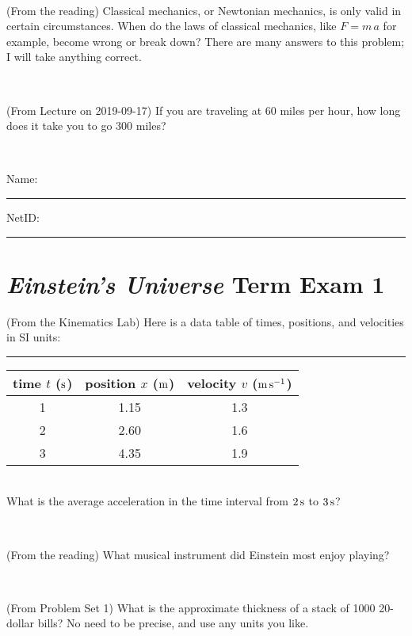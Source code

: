 \documentclass[12pt, letterpaper]{article}
\begin{document}
\vfill ~

\begin{problem} (From the reading)
Classical mechanics, or Newtonian mechanics, is only valid in certain
circumstances. When do the laws of classical mechanics, like $F =
m\,a$ for example, become wrong or break down? There are many answers
to this problem; I will take anything correct.
\end{problem}


\vfill ~

\begin{problem} (From Lecture on 2019-09-17)
If you are traveling at 60 miles per hour, how long does
it take you to go 300 miles?
\end{problem}


\vfill ~


\cleardoublepage



\noindent
Name: \rule[-1ex]{0.60\textwidth}{0.1pt}
NetID: \rule[-1ex]{0.20\textwidth}{0.1pt}

\section*{\textsl{Einstein's Universe} Term Exam 1}
\setcounter{problem}{1}


\begin{problem} (From the Kinematics Lab)
Here is a data table of times, positions, and velocities in SI units:\\
\rule{1.0in}{0pt}\begin{tabular}{c|c|c}
time $t$ ($\mathrm{s}$) & position $x$ ($\mathrm{m}$) & velocity $v$ ($\mathrm{m}\,\mathrm{s}^{-1}$) \\
\hline
1 & 1.15 & 1.3 \\
2 & 2.60 & 1.6 \\
3 & 4.35 & 1.9 \\
\hline
\end{tabular}\\
What is the average acceleration in the time interval from $2\,\mathrm{s}$ to $3\,\mathrm{s}$?
\end{problem}


\vfill ~

\begin{problem} (From the reading)
What musical instrument did Einstein most enjoy playing?
\end{problem}


\vfill ~

\begin{problem} (From Problem Set 1)
What is the approximate thickness of a stack of 1000 20-dollar bills?
No need to be precise, and use any units you like.
\end{problem}
\end{document}

